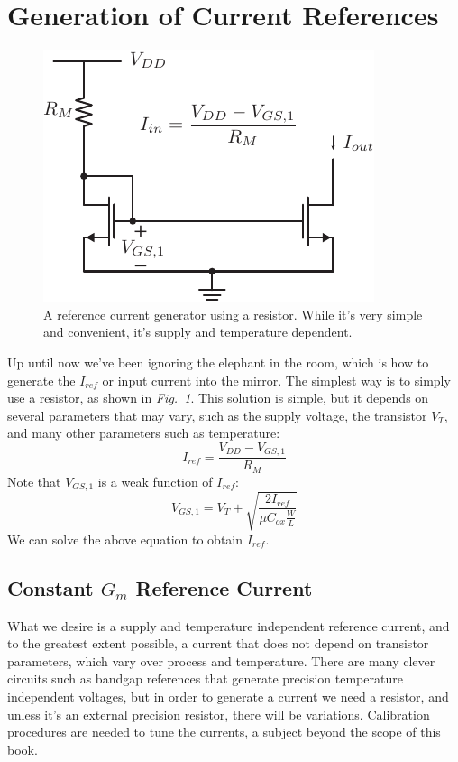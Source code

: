 \section{Generation of Current References}
\label{sec:Ireference}
\begin{figure}[tb]
\centering
\includegraphics[scale=1]{mirror_resistor.pdf}
\caption{A reference current generator using a resistor.  While it's very simple and convenient, it's supply and temperature dependent.}
\label{fig:iref_gen_rs}
\end{figure}
Up until now we've been ignoring the elephant in the room, which is how to generate the $I_{ref}$ or input current into the mirror.  The simplest way is to simply use a resistor, as shown in \emph{Fig.~\ref{fig:iref_gen_rs}}.  This solution is simple, but it depends on several parameters that may vary, such as the supply voltage, the transistor $V_T$, and many other parameters such as temperature:  
    \begin{equation}
        I_{ref} = \frac{V_{DD} - V_{GS,1}}{R_M}  
    \end{equation}
Note that $V_{GS,1}$ is a weak function of $I_{ref}$:
    \begin{equation}
        V_{GS,1} = V_T + \sqrt{\frac{2 I_{ref}}{\mu C_{ox} \frac{W}{L}}}
    \end{equation}
We can solve the above equation to obtain $I_{ref}$.
\subsection{Constant \texorpdfstring{$G_m$}{Transconductance} Reference Current}
What we desire is a supply and temperature independent reference current, and to the greatest extent possible, a current that does not depend on transistor parameters, which vary over process and temperature.  There are many clever circuits such as bandgap references that generate precision temperature independent voltages, but in order to generate a current we need a resistor, and unless it's an external precision resistor, there will be variations.  Calibration procedures are needed to tune the currents, a subject beyond the scope of this book.

